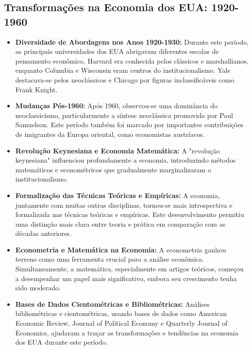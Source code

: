 \documentclass[a4paper,12pt]{article}[abntex2]
\begin{document}
\subsection{Transformações na Economia dos EUA: 1920-1960}
\begin{itemize}
  \item \textbf{Diversidade de Abordagens nos Anos 1920-1930:} Durante este período, as principais universidades dos EUA abrigavam diferentes escolas de pensamento econômico. Harvard era conhecida pelos clássicos e marshallianos, enquanto Columbia e Wisconsin eram centros do institucionalismo. Yale destacava-se pelos neoclássicos e Chicago por figuras inclassificáveis como Frank Knight.
  
  \item \textbf{Mudanças Pós-1960:} Após 1960, observou-se uma dominância do neoclassicismo, particularmente a síntese neoclássica promovida por Paul Samuelson. Este período também foi marcado por importantes contribuições de imigrantes da Europa oriental, como economistas austríacos.
  
  \item \textbf{Revolução Keynesiana e Economia Matemática:} A "revolução keynesiana" influenciou profundamente a economia, introduzindo métodos matemáticos e econométricos que gradualmente marginalizaram o institucionalismo.
  
  \item \textbf{Formalização das Técnicas Teóricas e Empíricas:} A economia, juntamente com muitas outras disciplinas, tornou-se mais introspectiva e formalizada nas técnicas teóricas e empíricas. Este desenvolvimento permitiu uma distinção mais clara entre teoria e prática em comparação com as décadas anteriores.
  
  \item \textbf{Econometria e Matemática na Economia:} A econometria ganhou terreno como uma ferramenta crucial para a análise econômica. Simultaneamente, a matemática, especialmente em artigos teóricos, começou a desempenhar um papel mais significativo, embora seu crescimento tenha sido moderado.
  
  \item \textbf{Bases de Dados Cientométricas e Bibliométricas:} Análises bibliométricas e cientométricas, usando bases de dados como American Economic Review, Journal of Political Economy e Quarterly Journal of Economics, ajudaram a traçar as transformações e tendências na economia dos EUA durante este período.
\end{itemize}
\end{document}
